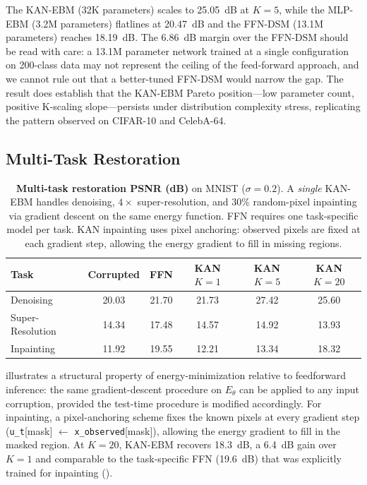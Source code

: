 \documentclass{article}
\begin{document}
The KAN-EBM (32K parameters) scales to 25.05~dB at $K{=}5$, while the MLP-EBM
(3.2M parameters) flatlines at 20.47~dB and the FFN-DSM (13.1M parameters) reaches
18.19~dB. The 6.86~dB margin over the FFN-DSM should be read with care: a 13.1M
parameter network trained at a single configuration on 200-class data may not
represent the ceiling of the feed-forward approach, and we cannot rule out that a
better-tuned FFN-DSM would narrow the gap. The result does establish that the
KAN-EBM Pareto position---low parameter count, positive K-scaling slope---persists
under distribution complexity stress, replicating the pattern observed on CIFAR-10
and CelebA-64.

\subsection{Multi-Task Restoration}
\label{sec:multitask}

\begin{table}[ht]
\centering
\caption{%
  \textbf{Multi-task restoration PSNR (dB)} on MNIST ($\sigma{=}0.2$).
  A \emph{single} KAN-EBM handles denoising, $4{\times}$ super-resolution, and
  30\% random-pixel inpainting via gradient descent on the same energy function.
  FFN requires one task-specific model per task.
  KAN inpainting uses pixel anchoring: observed pixels are fixed at each
  gradient step, allowing the energy gradient to fill in missing regions.
}
\label{tab:multitask}
\begin{tabular}{lccccc}
\toprule
Task & Corrupted & FFN & KAN $K{=}1$ & KAN $K{=}5$ & KAN $K{=}20$ \\
\midrule
Denoising        & 20.03 & 21.70 & 21.73 & 27.42 & 25.60 \\
Super-Resolution & 14.34 & 17.48 & 14.57 & 14.92 & 13.93 \\
Inpainting       & 11.92 & 19.55 & 12.21 & 13.34 & 18.32 \\
\bottomrule
\end{tabular}
\end{table}

 illustrates a structural property of energy-minimization
relative to feedforward inference: the same gradient-descent procedure on $E_\theta$ can be
applied to any input corruption, provided the test-time procedure is modified
accordingly. For inpainting, a pixel-anchoring scheme fixes the known pixels at
every gradient step (\texttt{u\_t}[mask] $\leftarrow$ \texttt{x\_observed}[mask]),
allowing the energy gradient to fill in the masked region. At $K{=}20$, KAN-EBM
recovers 18.3~dB, a 6.4~dB gain over $K{=}1$ and comparable to the task-specific
FFN (19.6~dB) that was explicitly trained for inpainting
().
\end{document}
